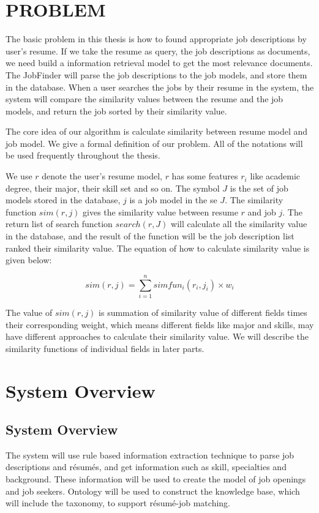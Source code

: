 \chapter{PROBLEM}

The basic problem in this thesis is how to found appropriate job descriptions by user's resume. If we take the resume as query, the job descriptions as documents, we need build a information retrieval model to get the most relevance documents.  The JobFinder will parse the job descriptions to the job models, and store them in the database. When a user searches the jobs by their resume in the system, the system will compare the similarity values between the resume and the job models, and return the job sorted by their similarity value.

The core idea of our algorithm is calculate similarity between resume model and job model.
We give a formal definition of our problem. All of the notations will be used frequently throughout the thesis.

We use $r$ denote the user's resume model, $r$ has some features $r_i$ like academic degree, their major, their skill set and so on. The symbol $J$ is the set of job models stored in the database, $j$ is a job model in the se $J$. The similarity function $sim(r, j)$ gives the similarity value between resume $r$ and job $j$. The return list of search function $search(r,J)$ will calculate all the similarity value in the database, and the result of the function will be the job description list ranked their similarity value. The equation of how to calculate similarity value is given below:

$$ sim(r, j) = \sum_{i=1}^{n} simfun_i(r_i,j_i) \times w_i $$

The value of $sim(r, j)$ is summation of similarity value of different fields times their corresponding weight, which means different fields like major and skills,  may have different approaches to calculate their similarity value. We will describe the similarity functions of individual fields in later parts.

\chapter{System Overview}

\section{System Overview}
The system will use rule based information extraction technique to parse job descriptions and r\'esum\'es, and get information such as skill, specialties and background. These information will be used to create the model of job openings and job seekers. Ontology will be used to construct the knowledge base, which will include the taxonomy, to support r\'esum\'e-job matching.

